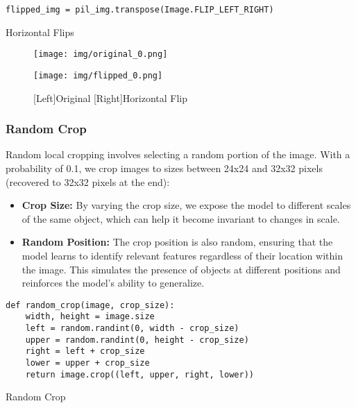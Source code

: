 \documentclass[a4paper,11pt]{article}
\begin{document}
\begin{listing}[!ht]
\begin{verbatim}
flipped_img = pil_img.transpose(Image.FLIP_LEFT_RIGHT)
\end{verbatim}
\caption{Horizontal Flips}
\label{listing:python}
\end{listing}

\begin{figure}[ht]
    \centering
    \begin{minipage}{0.49\textwidth}
        \texttt{[image: img/original\_0.png]}
    \end{minipage}
    \hfill
    \begin{minipage}{0.49\textwidth}
        \texttt{[image: img/flipped\_0.png]}
    \end{minipage}
    \caption{[Left]Original [Right]Horizontal Flip}
\end{figure}

\subsubsection{Random Crop}
Random local cropping involves selecting a random portion of the image. With a probability of 0.1, we crop images to sizes between 24x24 and 32x32 pixels (recovered to 32x32 pixels at the end):
\begin{itemize}
    \item \textbf{Crop Size:} By varying the crop size, we expose the model to different scales of the same object, which can help it become invariant to changes in scale.
    \item \textbf{Random Position:} The crop position is also random, ensuring that the model learns to identify relevant features regardless of their location within the image. This simulates the presence of objects at different positions and reinforces the model's ability to generalize.
\end{itemize}

\begin{listing}[!ht]
\begin{verbatim}
def random_crop(image, crop_size):
    width, height = image.size
    left = random.randint(0, width - crop_size)
    upper = random.randint(0, height - crop_size)
    right = left + crop_size
    lower = upper + crop_size
    return image.crop((left, upper, right, lower))
\end{verbatim}
\caption{Random Crop}
\label{listing:python}
\end{listing}
\end{document}
